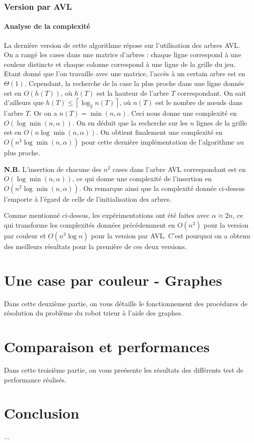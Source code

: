 \documentclass[12pt,a4paper]{article}
\begin{document}
\section{Version par AVL}
\subsection*{Analyse de la complexit\'e}
La derni\`ere version de cette algorithme r\'epose sur l'utilisation des 
arbres AVL. On a rang\'e les cases dans une matrice d'arbres : chaque ligne 
correspond \`a une couleur distincte et chaque colonne correspond \`a une ligne 
de la grille du jeu. Etant donn\'e que l'on travaille avec une matrice, 
l'acc\`es \`a un certain arbre est en $\Theta(1)$. Cependant, la recherche de 
la case la plus proche dans une ligne donn\'ee est en $O(h(T))$, o\`u $h(T)$ 
est la hauteur de l'arbre $T$ correspondant. On sait d'ailleurs que $h(T) \leq 
\left \lceil \log_2 n(T) \right \rceil$, o\`u $n(T)$ est le nombre de 
n\oe uds dans l'arbre $T$. Or on a $n(T) = \min(n,\alpha)$. 
Ceci nous donne une complexit\'e en $O(\log \min(n,\alpha))$. On en d\'eduit 
que la recherche sur les $n$ lignes de la grille est en $O(n\log 
\min(n,\alpha))$. On obtient finalement une complexit\'e en $O(n^3\log 
\min(n,\alpha))$ pour cette derni\`ere impl\'ementation de l'algorithme au plus 
proche.

{\bfseries N.B.} L'insertion de chacune des $n^2$ cases dans l'arbre 
AVL correspondant est en $O(\log \min(n,\alpha))$, ce qui donne une 
complexit\'e de l'insertion en $O(n^2\log \min(n,\alpha))$. On remarque ainsi 
que la complexit\'e donn\'ee ci-dessus l'emporte \`a l'\'egard de celle de 
l'initialisation des arbres. \par
Comme mentionn\'e ci-dessus, les exp\'erimentations ont \'et\'e faites avec 
$\alpha \approx 2n$, ce qui transforme les complexit\'es donn\'ees 
pr\'ec\'edemment en $O(n^3)$ pour la version par couleur et $O(n^3\log n)$ pour 
la version par AVL. C'est pourquoi on a obtenu des meilleurs r\'esultats pour 
la premi\`ere de ces deux versions.

\newpage

\part{Une case par couleur - Graphes}
Dans cette deuxi\`eme partie, on vous d\'etaille le fonctionnement des 
proc\'edures de r\'esolution du probl\`eme du robot trieur \`a l'aide des 
graphes.

\newpage

\part{Comparaison et performances}
Dans cette troisi\`eme partie, on vous pre\'esente les r\'esultats des 
diff\'erents test de performance r\'ealis\'es.

\newpage

\part*{Conclusion}
...
\end{document}
